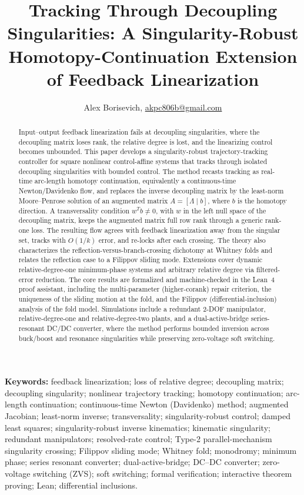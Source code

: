 \documentclass[11pt,american]{article}
\title{Tracking Through Decoupling Singularities: A Singularity-Robust Homotopy-Continuation Extension of Feedback Linearization}
\author{Alex Borisevich, \href{mailto:akpc806b@gmail.com}{akpc806b@gmail.com}}
\theoremstyle{definition}
\theoremstyle{plain}
\theoremstyle{remark}
\begin{document}
\maketitle

\begin{abstract}
Input--output feedback linearization fails at decoupling singularities, where the decoupling matrix loses rank, the relative degree is lost, and the linearizing control becomes unbounded. This paper develops a singularity-robust trajectory-tracking controller for square nonlinear control-affine systems that tracks through isolated decoupling singularities with bounded control. The method recasts tracking as real-time arc-length homotopy continuation, equivalently a continuous-time Newton/Davidenko flow, and replaces the inverse decoupling matrix by the least-norm Moore--Penrose solution of an augmented matrix $A=[\Lambda\mid b]$, where $b$ is the homotopy direction. A transversality condition $w^T b \ne 0$, with $w$ in the left null space of the decoupling matrix, keeps the augmented matrix full row rank through a generic rank-one loss. The resulting flow agrees with feedback linearization away from the singular set, tracks with $O(1/k)$ error, and re-locks after each crossing. The theory also characterizes the reflection-versus-branch-crossing dichotomy at Whitney folds and relates the reflection case to a Filippov sliding mode. Extensions cover dynamic relative-degree-one minimum-phase systems and arbitrary relative degree via filtered-error reduction. The core results are formalized and machine-checked in the Lean~4 proof assistant, including the multi-parameter (higher-corank) repair criterion, the uniqueness of the sliding motion at the fold, and the Filippov (differential-inclusion) analysis of the fold model. Simulations include a redundant 2-DOF manipulator, relative-degree-one and relative-degree-two plants, and a dual-active-bridge series-resonant DC/DC converter, where the method performs bounded inversion across buck/boost and resonance singularities while preserving zero-voltage soft switching.
\end{abstract}

\medskip
\noindent\textbf{Keywords:} feedback linearization; loss of relative degree; decoupling matrix; decoupling singularity; nonlinear trajectory tracking; homotopy continuation; arc-length continuation; continuous-time Newton (Davidenko) method; augmented Jacobian; least-norm inverse; transversality; singularity-robust control; damped least squares; singularity-robust inverse kinematics; kinematic singularity; redundant manipulators; resolved-rate control; Type-2 parallel-mechanism singularity crossing; Filippov sliding mode; Whitney fold; monodromy; minimum phase; series resonant converter; dual-active-bridge; DC--DC converter; zero-voltage switching (ZVS); soft switching; formal verification; interactive theorem proving; Lean; differential inclusions.
\end{document}
